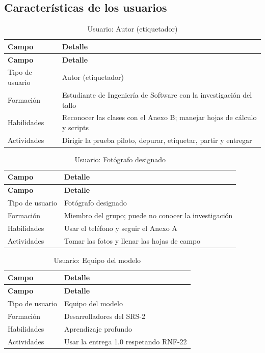 \documentclass[11pt]{article}
\begin{document}
\subsection{Características de los usuarios}
{\small
\begin{longtable}{|>{\RaggedRight\arraybackslash}p{3.91cm}|>{\RaggedRight\arraybackslash}p{10.95cm}|}
\caption{Usuario: Autor (etiquetador)}\\
\hline
\rowcolor{encabezado}\textbf{Campo} & \textbf{Detalle} \\ \hline
\endfirsthead
\hline
\rowcolor{encabezado}\textbf{Campo} & \textbf{Detalle} \\ \hline
\endhead
Tipo de usuario & Autor (etiquetador) \\ \hline
Formación & Estudiante de Ingeniería de Software con la investigación del tallo \\ \hline
Habilidades & Reconocer las clases con el Anexo B; manejar hojas de cálculo y scripts \\ \hline
Actividades & Dirigir la prueba piloto, depurar, etiquetar, partir y entregar \\ \hline
\end{longtable}}
{\small
\begin{longtable}{|>{\RaggedRight\arraybackslash}p{3.91cm}|>{\RaggedRight\arraybackslash}p{10.95cm}|}
\caption{Usuario: Fotógrafo designado}\\
\hline
\rowcolor{encabezado}\textbf{Campo} & \textbf{Detalle} \\ \hline
\endfirsthead
\hline
\rowcolor{encabezado}\textbf{Campo} & \textbf{Detalle} \\ \hline
\endhead
Tipo de usuario & Fotógrafo designado \\ \hline
Formación & Miembro del grupo; puede no conocer la investigación \\ \hline
Habilidades & Usar el teléfono y seguir el Anexo A \\ \hline
Actividades & Tomar las fotos y llenar las hojas de campo \\ \hline
\end{longtable}}
{\small
\begin{longtable}{|>{\RaggedRight\arraybackslash}p{3.91cm}|>{\RaggedRight\arraybackslash}p{10.95cm}|}
\caption{Usuario: Equipo del modelo}\\
\hline
\rowcolor{encabezado}\textbf{Campo} & \textbf{Detalle} \\ \hline
\endfirsthead
\hline
\rowcolor{encabezado}\textbf{Campo} & \textbf{Detalle} \\ \hline
\endhead
Tipo de usuario & Equipo del modelo \\ \hline
Formación & Desarrolladores del SRS-2 \\ \hline
Habilidades & Aprendizaje profundo \\ \hline
Actividades & Usar la entrega 1.0 respetando RNF-22 \\ \hline
\end{longtable}}
\end{document}
